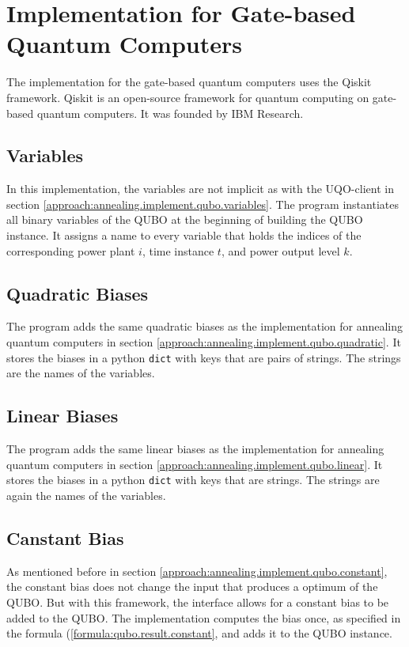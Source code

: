 \section{Implementation for Gate-based Quantum Computers}

The implementation for the gate-based quantum computers uses the Qiskit framework.
Qiskit is an open-source framework for quantum computing on gate-based quantum computers.
It was founded by IBM Research.
\cite{QiskitWeb, QiskitGitHub}

\subsection{Variables}

In this implementation, the variables are not implicit as with the UQO-client in section \ref{approach:annealing.implement.qubo.variables}.
The program instantiates all binary variables of the QUBO at the beginning of building the QUBO instance.
It assigns a name to every variable that holds the indices of the corresponding power plant $i$, time instance $t$, and power output level $k$.

\subsection{Quadratic Biases}

The program adds the same quadratic biases as the implementation for annealing quantum computers in section \ref{approach:annealing.implement.qubo.quadratic}.
It stores the biases in a python \texttt{dict} with keys that are pairs of strings.
The strings are the names of the variables.

\subsection{Linear Biases}

The program adds the same linear biases as the implementation for annealing quantum computers in section \ref{approach:annealing.implement.qubo.linear}.
It stores the biases in a python \texttt{dict} with keys that are strings.
The strings are again the names of the variables.

\subsection{Canstant Bias}

As mentioned before in section \ref{approach:annealing.implement.qubo.constant}, the constant bias does not change the input that produces a optimum of the QUBO.
But with this framework, the interface allows for a constant bias to be added to the QUBO.
The implementation computes the bias once, as specified in the formula (\ref{formula:qubo.result.constant}, and adds it to the QUBO instance.
